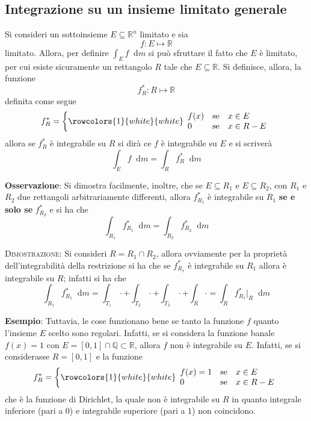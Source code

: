\documentclass[a4paper]{extarticle}
\newcommand*\dif{\mathop{}\!\mathrm{d}}
\begin{document}
\subsection{Integrazione su un insieme limitato generale}
Si consideri un sottoinsieme $E \subseteq \mathbb{R}^n$ limitato e sia
\[f : E \longmapsto \mathbb{R}\]
limitato. Allora, per definire $\displaystyle{\int_E f \dif m}$ si può sfruttare il fatto che $E$ è limitato, per cui esiste sicuramente un rettangolo $R$ tale che $E \subseteq \mathbb{R}$. Si definisce, allora, la funzione
\[f^*_R : R \longmapsto \mathbb{R}\]
definita come segue
\[f^*_R = \left\{\rowcolors{1}{white}{white}    
\begin{array}{lll}
    f(x) & \text{se} & x \in E\\
    0   & \text{se}  & x \in R - E\\
\end{array}
\right.\]
allora se $f^*_R$ è integrabile su $R$ si dirà ce $f$ è integrabile su $E$ e si scriverà
\[\int_E f \dif m = \int_R f^*_R \dif m\]

\vspace{2em}
\noindent
\textbf{Osservazione}: Si dimostra facilmente, inoltre, che se $E \subseteq R_1$ e $E \subseteq R_2$, con $R_1$ e $R_2$ due rettangoli arbitrariamente differenti, allora $f^*_{R_1}$ è integrabile su $R_1$ \textbf{se e solo se} $f^*_{R_2}$ e si ha che
\[\int_{R_1} f^*_{R_1} \dif m = \int_{R_2} f^*_{R_2} \dif m\]

\vspace{2em}
\noindent
\normalfont \normalsize
\textsc{Dimostrazione}: Si consideri $R = R_1 \cap R_2$, allora ovviamente per la proprietà dell'integrabilità della restrizione si ha che se $f^*_{R_1}$ è integrabile su $R_1$ allora è integrabile su $R$; infatti si ha che
\[\int_{R_1} f^*_{R_1} \dif m = \int_{T_1} \cdot + \int_{T_2} \cdot + \int_{T_3} \cdot + \int_{R} \cdot = \int_R f^*_{R_1} \vert_R \dif m\]

\vspace{2em}
\noindent
\textbf{Esempio}: Tuttavia, le cose funzionano bene se tanto la funzione $f$ quanto l'insieme $E$ scelto sono regolari. Infatti, se si considera la funzione banale $f(x)=1$ con $E=[0,1] \cap \mathbb{Q} \subset \mathbb{R}$, allora $f$ non è integrabile su $E$. Infatti, se si considerasse $R=[0,1]$ e la funzione
\[f^*_R = \left\{\rowcolors{1}{white}{white}    
\begin{array}{lll}
    f(x)=1 & \text{se} & x \in E\\
    0   & \text{se}  & x \in R - E\\
\end{array}
\right.\]
che è la funzione di Dirichlet, la quale non è integrabile su $R$ in quanto integrale inferiore (pari a $0$) e integrabile superiore (pari a $1$) non coincidono.
\end{document}
